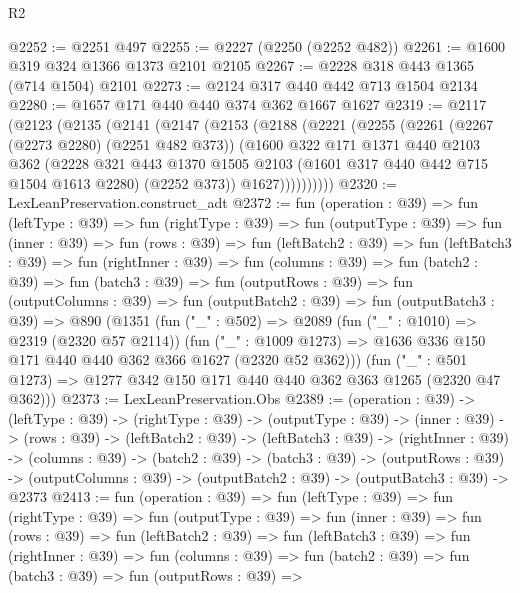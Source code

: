 \begin{lexlean}{R2}
\begin{coremodule}
@2252 := @2251 @497
@2255 := @2227 (@2250 (@2252 @482))
@2261 := @1600 @319 @324 @1366 @1373 @2101 @2105
@2267 := @2228 @318 @443 @1365 (@714 @1504) @2101
@2273 := @2124 @317 @440 @442 @713 @1504 @2134
@2280 := @1657 @171 @440 @440 @374 @362 @1667 @1627
@2319 := @2117
    (@2123
      (@2135
        (@2141
          (@2147
            (@2153
              (@2188
                (@2221
                  (@2255
                    (@2261
                      (@2267 (@2273 @2280) (@2251 @482 @373))
                      (@1600
                        @322
                        @171
                        @1371
                        @440
                        @2103
                        @362
                        (@2228
                          @321
                          @443
                          @1370
                          @1505
                          @2103
                          (@1601 @317 @440 @442 @715 @1504 @1613 @2280)
                          (@2252 @373))
                        @1627))))))))))
@2320 := LexLeanPreservation.construct_adt
@2372 := fun (operation : @39) =>
  fun (leftType : @39) =>
  fun (rightType : @39) =>
  fun (outputType : @39) =>
  fun (inner : @39) =>
  fun (rows : @39) =>
  fun (leftBatch2 : @39) =>
  fun (leftBatch3 : @39) =>
  fun (rightInner : @39) =>
  fun (columns : @39) =>
  fun (batch2 : @39) =>
  fun (batch3 : @39) =>
  fun (outputRows : @39) =>
  fun (outputColumns : @39) =>
  fun (outputBatch2 : @39) =>
  fun (outputBatch3 : @39) =>
  @890
    (@1351
      (fun ("_" : @502) =>
      @2089
        (fun ("_" : @1010) => @2319 (@2320 @57 @2114))
        (fun ("_" : @1009 @1273) =>
        @1636 @336 @150 @171 @440 @440 @362 @366 @1627 (@2320 @52 @362)))
      (fun ("_" : @501 @1273) => @1277 @342 @150 @171 @440 @440 @362 @363 @1265 (@2320 @47 @362)))
@2373 := LexLeanPreservation.Obs
@2389 := (operation : @39) ->
  (leftType : @39) ->
  (rightType : @39) ->
  (outputType : @39) ->
  (inner : @39) ->
  (rows : @39) ->
  (leftBatch2 : @39) ->
  (leftBatch3 : @39) ->
  (rightInner : @39) ->
  (columns : @39) ->
  (batch2 : @39) ->
  (batch3 : @39) ->
  (outputRows : @39) ->
  (outputColumns : @39) -> (outputBatch2 : @39) -> (outputBatch3 : @39) -> @2373
@2413 := fun (operation : @39) =>
  fun (leftType : @39) =>
  fun (rightType : @39) =>
  fun (outputType : @39) =>
  fun (inner : @39) =>
  fun (rows : @39) =>
  fun (leftBatch2 : @39) =>
  fun (leftBatch3 : @39) =>
  fun (rightInner : @39) =>
  fun (columns : @39) =>
  fun (batch2 : @39) =>
  fun (batch3 : @39) =>
  fun (outputRows : @39) =>

\end{coremodule}
\end{lexlean}
